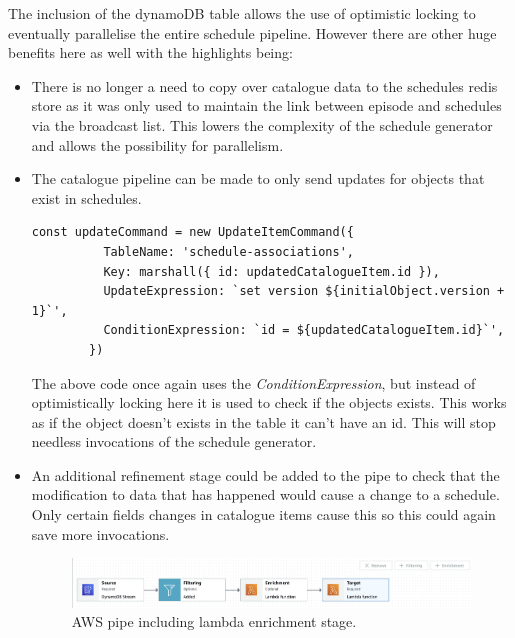   The inclusion of the dynamoDB table allows the use of optimistic locking to eventually parallelise the entire schedule pipeline. However there are 
  other huge benefits here as well with the highlights being:

  \begin{itemize}
    \item There is no longer a need to copy over catalogue data to the schedules redis store as it was only used to maintain the link between episode and 
    schedules via the broadcast list. This lowers the complexity of the schedule generator and allows the possibility for parallelism.
    \item The catalogue pipeline can be made to only send updates for objects that exist in schedules. 
      \begin{lstlisting}[caption=SDK command sent by catalogue pipeline to ignore non schedule related catalogue items.]
        const updateCommand = new UpdateItemCommand({
          TableName: 'schedule-associations',
          Key: marshall({ id: updatedCatalogueItem.id }),
          UpdateExpression: `set version ${initialObject.version + 1}`',
          ConditionExpression: `id = ${updatedCatalogueItem.id}`',
        })
      \end{lstlisting} 
      The above code once again uses the \emph{ConditionExpression}, but instead of optimistically locking here it is used to check if the objects exists.
      This works as if the object doesn't exists in the table it can't have an id. This will stop needless invocations of the schedule generator.
    \item An additional refinement stage could be added to the pipe to check that the modification to data that has happened would cause a change to a
    schedule. Only certain fields changes in catalogue items cause this so this could again save more invocations.
  
      \begin{figure}[H]
        \centering
        \includegraphics[width=12cm]{assets/awsPipeFull.png}
        \caption{AWS pipe including lambda enrichment stage.}
        \label{fig:awsPipeFull}
      \end{figure}
  \end{itemize}

\newpage
